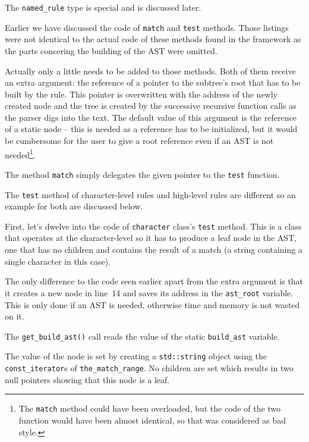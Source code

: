 \documentclass[12pt]{article}
\begin{document}
The \texttt{named\_rule} type is special and is discussed later.

Earlier we have discussed the code of \texttt{match} and \texttt{test} methods. Those listings were not
identical to the actual code of these methods found in the framework as the parts concering the building of
the AST were omitted.

Actually only a little needs to be added to those methods. Both of them receive an extra argument: the
reference of a pointer to the subtree's root that has to be built by the rule. This pointer is overwritten
with the address of the newly created node and the tree is created by the successive recursive function calls
as the parser digs into the text. The default value of this argument is the reference of a static node -- this
is needed as a reference has to be initialized, but it would be cumbersome for the user to give a root
reference even if an AST is not needed\footnote{The \texttt{match} method could have been overloaded, but the
code of the two function would have been almost identical, so that was considered as bad style.}.

The method \texttt{match} simply delegates the given pointer to the \texttt{test} function.

The \texttt{test} method of character-level rules and high-level rules are different so an example for both
are discussed below.

First, let's dwelve into the code of \texttt{character} class's \texttt{test} method. This is a class that
operates at the character-level so it has to produce a leaf node in the AST, one that has no children and
contains the result of a match (a string containing a single character in this case).

The only difference to the code seen earlier apart from the extra argument is that it creates a new node in
line~14 and saves its address in the \texttt{ast\_root} variable. This is only done if an AST is needed,
otherwise time and memory is not wasted on it.

The \texttt{get\_build\_ast()} call reads the value of the static \texttt{build\_ast} variable.

The value of the node is set by creating a \texttt{std::string} object using the \texttt{const\_iterator}s
of \texttt{the\_match\_range}. No children are set which results in two null pointers showing that this node
is a leaf.
\end{document}
